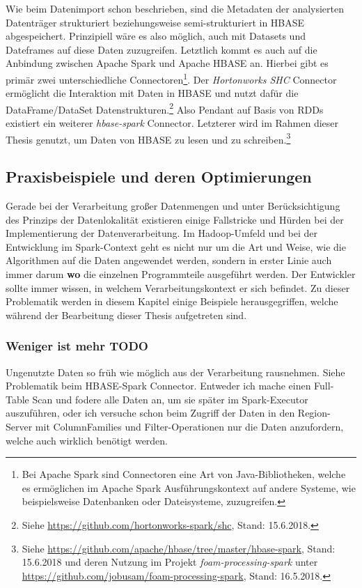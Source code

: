 \noindent
Wie beim Datenimport schon beschrieben, sind die Metadaten der analysierten Datenträger strukturiert beziehungsweise semi-strukturiert in HBASE abgespeichert. Prinzipiell wäre es also möglich, auch mit Datasets und Dateframes auf diese Daten zuzugreifen. Letztlich kommt es auch auf die Anbindung zwischen Apache Spark und Apache HBASE an. Hierbei gibt es primär zwei unterschiedliche Connectoren\footnote{Bei Apache Spark sind Connectoren eine Art von Java-Bibliotheken, welche es ermöglichen im Apache Spark Ausführungskontext auf andere Systeme, wie beispielsweise Datenbanken oder Dateisysteme, zuzugreifen.}. Der \textit{Hortonworks SHC} Connector ermöglicht die Interaktion mit Daten in HBASE und nutzt dafür die DataFrame/DataSet Datenstrukturen.\footnote{Siehe \url{https://github.com/hortonworks-spark/shc}, Stand: 15.6.2018.} 
Also Pendant auf Basis von RDDs existiert ein weiterer \textit{hbase-spark} Connector. Letzterer wird im Rahmen dieser Thesis genutzt, um Daten von HBASE zu lesen und zu schreiben.\footnote{Siehe \url{https://github.com/apache/hbase/tree/master/hbase-spark}, Stand: 15.6.2018 und deren Nutzung im Projekt \textit{foam-processing-spark} unter \url{https://github.com/jobusam/foam-processing-spark}, Stand: 16.5.2018.}

\subsection{Praxisbeispiele und deren Optimierungen}
Gerade bei der Verarbeitung großer Datenmengen und unter Berücksichtigung des Prinzips der Datenlokalität existieren einige Fallstricke und Hürden bei der Implementierung der Datenverarbeitung. Im Hadoop-Umfeld und bei der Entwicklung im Spark-Context geht es nicht nur um die Art und Weise, wie die Algorithmen auf die Daten angewendet werden, sondern in erster Linie auch immer darum \textbf{wo} die einzelnen Programmteile ausgeführt werden. 
Der Entwickler sollte immer wissen, in welchem Verarbeitungskontext er sich befindet. Zu dieser Problematik werden in diesem Kapitel einige Beispiele herausgegriffen, welche während der Bearbeitung dieser Thesis aufgetreten sind.\\

\noindent
\subsubsection*{Weniger ist mehr TODO}
Ungenutzte Daten so früh wie möglich aus der Verarbeitung rausnehmen. Siehe
Problematik beim HBASE-Spark Connector. Entweder ich mache einen Full-Table Scan und fodere
alle Daten an, um sie später im Spark-Executor auszuführen, oder ich versuche schon beim Zugriff der Daten in den Region-Server mit ColumnFamilies und Filter-Operationen nur die Daten anzufordern, welche auch wirklich benötigt werden. 
